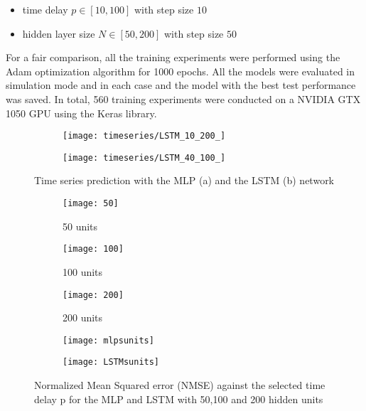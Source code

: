 \documentclass[conference,compsoc]{IEEEtran}
\begin{document}
 \begin{itemize}
 
 \item time delay $p \in [10,100]$ with step size $10$
 \item hidden layer size $N \in [50,200]$ with step size $50$

 \end{itemize}

For a fair comparison, all the training experiments were performed using the Adam optimization algorithm for 1000 epochs. All the models were evaluated in simulation mode and in each case and the model with the best test performance was saved. In total, 560 training experiments were conducted on a NVIDIA GTX 1050 GPU using the Keras library. 

  \begin{figure*}
	\begin{subfigure}{8cm}
            \texttt{[image: timeseries/LSTM\_10\_200\_]}          
        \end{subfigure}
        \begin{subfigure}{8cm}
            \texttt{[image: timeseries/LSTM\_40\_100\_]}            
        \end{subfigure}  

        \caption{Time series prediction with the MLP (a) and the LSTM (b) network }
                
        \label{fig:santafe1}
    \end{figure*}


       \begin{figure*}[]
        \begin{subfigure}{0.33\linewidth}
            \texttt{[image: 50]}
            \caption{50 units}
        \end{subfigure}
        \begin{subfigure}{0.33\linewidth}
            \texttt{[image: 100]}
            \caption{100 units}
        \end{subfigure}
        \begin{subfigure}{0.33\linewidth}
            \texttt{[image: 200]}
            \caption{200 units}
        \end{subfigure}

\centering
	\begin{subfigure}{6cm}
            \texttt{[image: mlpsunits]}          
        \end{subfigure}
        \begin{subfigure}{6cm}
            \texttt{[image: LSTMsunits]}            
        \end{subfigure}  

        \caption{Normalized Mean Squared error (NMSE) against the selected time delay p for the MLP and LSTM with 50,100 and 200 hidden units  }
                
        \label{fig:rectune}
    \end{figure*}
\end{document}
